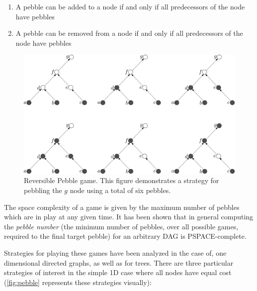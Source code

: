 \begin{enumerate}

  \item A pebble can be added to a node if and only if all predecessors of the
    node have pebbles

  \item A pebble can be removed from a node if and only if all predecessors of
    the node have pebbles

\end{enumerate}

\begin{figure}
      \capstart
      \centering
      \includegraphics[width=0.9\hsize]{images/rev-peb-game}

      \caption{Reversible Pebble game. This figure demonstrates a strategy for
      pebbling the $g$ node using a total of six pebbles.}
      
      \label{fig:rev-peb-game}
\end{figure}

The space complexity of a game is given by the maximum number of pebbles which
are in play at any given time. It has been shown that in general computing the
\emph{pebble number} (the minimum number of pebbles, over all possible games,
required to the final target pebble) for an arbitrary DAG is
PSPACE-complete\cite{chan13}\footnotemark.


Strategies for playing these games have been analyzed in the case of, one
dimensional directed graphs, as well as for trees\cite{peb16}.  There are three
particular strategies of interest in the simple 1D case where all nodes have
equal cost (\cref{fig:pebble} represents these strategies visually):


